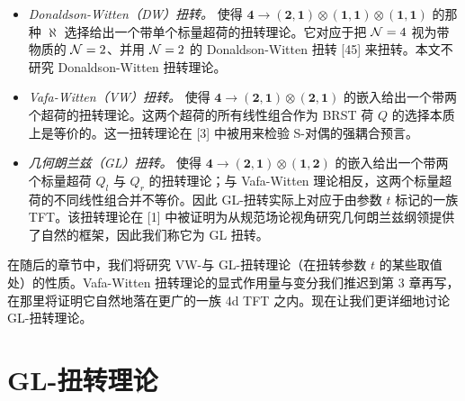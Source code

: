
\begin{itemize}
\item \emph{Donaldson-Witten（DW）扭转。} 使得 $\mathbf{4}\to(\mathbf{2},\mathbf{1})\otimes(\mathbf{1},\mathbf{1})\otimes(\mathbf{1},\mathbf{1})$ 的那种 $\aleph$ 选择给出一个带单个标量超荷的扭转理论。它对应于把 $\mathcal{N}=4$ 视为带物质的 $\mathcal{N}=2$、并用 $\mathcal{N}=2$ 的 Donaldson-Witten 扭转 [45] 来扭转。本文不研究 Donaldson-Witten 扭转理论。

\item \emph{Vafa-Witten（VW）扭转。} 使得 $\mathbf{4}\to(\mathbf{2},\mathbf{1})\otimes(\mathbf{2},\mathbf{1})$ 的嵌入给出一个带两个超荷的扭转理论。这两个超荷的所有线性组合作为 BRST 荷 $Q$ 的选择本质上是等价的。这一扭转理论在 [3] 中被用来检验 S-对偶的强耦合预言。

\item \emph{几何朗兰兹（GL）扭转。} 使得 $\mathbf{4}\to(\mathbf{2},\mathbf{1})\otimes(\mathbf{1},\mathbf{2})$ 的嵌入给出一个带两个标量超荷 $Q_l$ 与 $Q_r$ 的扭转理论；与 Vafa-Witten 理论相反，这两个标量超荷的不同线性组合并不等价。因此 GL-扭转实际上对应于由参数 $t$ 标记的一族 TFT。该扭转理论在 [1] 中被证明为从规范场论视角研究几何朗兰兹纲领提供了自然的框架，因此我们称它为 GL 扭转。
\end{itemize}

在随后的章节中，我们将研究 VW-与 GL-扭转理论（在扭转参数 $t$ 的某些取值处）的性质。Vafa-Witten 扭转理论的显式作用量与变分我们推迟到第 3 章再写，在那里将证明它自然地落在更广的一族 4d TFT 之内。现在让我们更详细地讨论 GL-扭转理论。

\section{GL-扭转理论}

